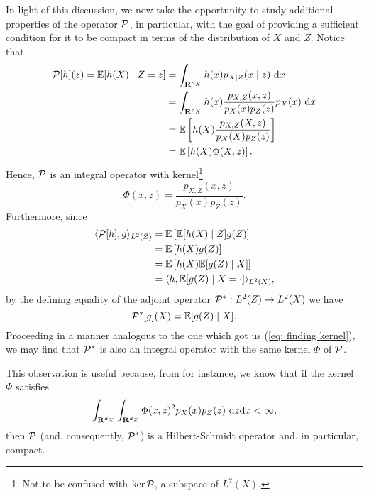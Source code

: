 In light of this discussion, we now take the opportunity to study additional properties of the operator $ \mathcal{P} $, in particular, with the goal of providing a sufficient condition for it to be compact in terms of the distribution of $ X $ and $ Z $.
Notice that
\begin{align}
    \mathcal{P} [ h ] ( z )
    = \mathbb{E} [ h ( X ) \mid Z = z ] 
    &= \int_{ \mathbf{R}^{ d_{ X } } } h ( x ) p_{ X \mid Z } ( x \mid z ) \ \mathrm{d} x \nonumber \\
    &= \int_{ \mathbf{R}^{ d_{ X } } } h ( x ) \frac{ p_{ X, Z } ( x, z ) }{ p_{ X } ( x ) p_{ Z } ( z ) } p_{ X } ( x ) \ \mathrm{d} x \nonumber \\
    &= \mathbb{E} \left[
        h ( X ) \frac{ p_{ X, Z } ( X, z ) }{ p_{ X } ( X ) p_{ Z } ( z ) }
    \right] \nonumber \\
    &= \mathbb{E} \left[ h ( X ) \Phi ( X, z ) \right] \label{eq: finding kernel}
.\end{align}
Hence, $ \mathcal{P} $ is an integral operator with kernel\footnote{Not to be confused with $ \ker \mathcal{P} $, a subspace of $ L^{ 2 } ( X ) $.}
\begin{equation*}
    \Phi ( x, z ) = \frac{ p_{ X, Z } ( x, z ) }{ p_{ X } ( x ) p_{ Z } ( z ) }
.\end{equation*}
Furthermore, since
\begin{align*}
    \langle  \mathcal{P}[h], g  \rangle_{ L^{ 2 } ( Z ) }
    &= \mathbb{E} \left[ \mathbb{E} [ h ( X ) \mid Z ] g ( Z ) \right] \\
    &= \mathbb{E} \left[ h ( X ) g ( Z ) \right] \\
    &= \mathbb{E} \left[ h ( X ) \mathbb{E} [ g ( Z ) \mid X ] \right] \\
    &= \langle  h, \mathbb{E} [ g ( Z ) \mid X = \cdot ]  \rangle_{ L^{ 2 } ( X ) }
,\end{align*}
by the defining equality of the adjoint operator $ \mathcal{P}^{ * } : L^{ 2 } ( Z ) \to L^{ 2 } ( X ) $ we have
\begin{equation*}
    \mathcal{P}^{ * } [ g ] ( X ) = \mathbb{E} [ g ( Z ) \mid X ]
.\end{equation*}
Proceeding in a manner analogous to the one which got us (\ref{eq: finding kernel}), we may find that $ \mathcal{P}^{ * } $ is also an integral operator with the same kernel $ \Phi $ of $ \mathcal{P} $.

This observation is useful because, from \cite[theorem 2.34]{florens2007} for instance, we know that if the kernel $ \Phi $ satisfies
\begin{equation}
    \label{eq: Phi square integrable}
    \int_{ \mathbf{R}^{ d_{ X } } } \int_{ \mathbf{R}^{ d_{ Z } } } \Phi ( x, z )^2 p_{ X } ( x ) p_{ Z } ( z ) \ \mathrm{d} z \mathrm{d} x < \infty
,\end{equation}
then $ \mathcal{P} $ (and, consequently, $ \mathcal{P}^{ * } $) is a Hilbert-Schmidt operator and, in particular, compact.

